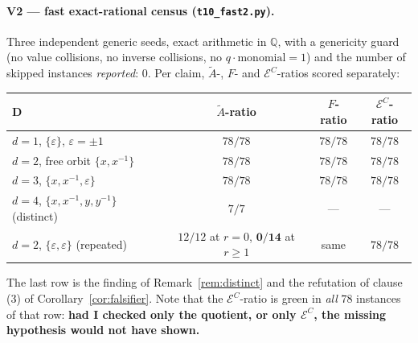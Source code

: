 \documentclass[11pt]{article}
\theoremstyle{definition}
\newcommand{\At}{\widetilde{A}}
\newcommand{\bD}{\mathbf{D}}
\begin{document}
\paragraph{V2 --- fast exact-rational census (\texttt{t10\_fast2.py}).}
Three independent generic seeds, exact arithmetic in $\mathbb{Q}$, with a
genericity guard (no value collisions, no inverse collisions, no
$q\cdot\text{monomial}=1$) and the number of skipped instances \emph{reported}:
$0$.  Per claim, $\At$-, $F$- and $\mathcal{E}^{C}$-ratios scored separately:
\begin{center}
\begin{tabular}{lccc}
\toprule
$\bD$ & $\At$-ratio & $F$-ratio & $\mathcal{E}^{C}$-ratio\\\midrule
$d=1$, $\{\varepsilon\}$, $\varepsilon=\pm1$ & $78/78$ & $78/78$ & $78/78$\\
$d=2$, free orbit $\{x,x^{-1}\}$             & $78/78$ & $78/78$ & $78/78$\\
$d=3$, $\{x,x^{-1},\varepsilon\}$            & $78/78$ & $78/78$ & $78/78$\\
$d=4$, $\{x,x^{-1},y,y^{-1}\}$ (distinct)    & $7/7$   & ---     & ---\\
$d=2$, $\{\varepsilon,\varepsilon\}$ (repeated) & $12/12$ at $r=0$, $\mathbf{0/14}$ at $r\ge1$ & same & $78/78$\\
\bottomrule
\end{tabular}
\end{center}
The last row is the finding of Remark~\ref{rem:distinct} and the refutation of
clause (3) of Corollary~\ref{cor:falsifier}.  Note that the
$\mathcal{E}^{C}$-ratio is green in \emph{all} $78$ instances of that row:
\textbf{had I checked only the quotient, or only $\mathcal{E}^{C}$, the missing
hypothesis would not have shown.}
\end{document}
